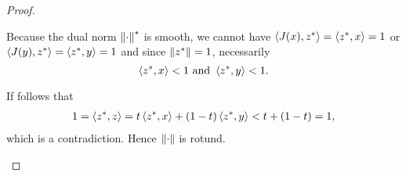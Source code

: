 \begin{proof}
\begin{enumerate}
    Because the dual norm \( \left\Vert \cdot \right\Vert^* \) is smooth, we cannot have \( \left\langle J(x), z^* \right\rangle =  \left\langle z^*, x \right\rangle = 1 \) or \( \left\langle J(y), z^* \right\rangle = \left\langle z^*, y \right\rangle = 1 \) and since \( \left\Vert z^* \right\Vert = 1 \), necessarily
    \begin{equation*}
      \left\langle z^*, x \right\rangle < 1 \text{ and } \left\langle z^*, y \right\rangle < 1.
    \end{equation*}

    If follows that
    \begin{align*}
      1
      =
      \left\langle z^*, z \right\rangle
      =
      t \left\langle z^*, x \right\rangle + (1-t) \left\langle z^*, y \right\rangle
      <
      t + (1-t)
      =
      1,
    \end{align*}
    which is a contradiction. Hence \( \left\Vert \cdot \right\Vert \) is rotund.
  \end{enumerate}
\end{proof}

